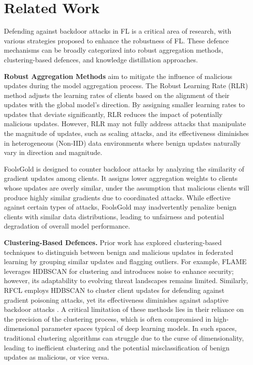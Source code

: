 \section{Related Work}
Defending against backdoor attacks in FL is a critical area of research, with various strategies proposed to enhance the robustness of FL. These defence mechanisms can be broadly categorized into robust aggregation methods, clustering-based defences, and knowledge distillation approaches.

\textbf{Robust Aggregation Methods} aim to mitigate the influence of malicious updates during the model aggregation process. The Robust Learning Rate (RLR) method \cite{ref_article17} adjusts the learning rates of clients based on the alignment of their updates with the global model's direction. By assigning smaller learning rates to updates that deviate significantly, RLR reduces the impact of potentially malicious updates. However, RLR may not fully address attacks that manipulate the magnitude of updates, such as scaling attacks, and its effectiveness diminishes in heterogeneous (Non-IID) data environments where benign updates naturally vary in direction and magnitude. 

FoolsGold \cite{ref_article8} is designed to counter backdoor attacks by analyzing the similarity of gradient updates among clients. It assigns lower aggregation weights to clients whose updates are overly similar, under the assumption that malicious clients will produce highly similar gradients due to coordinated attacks. While effective against certain types of attacks, FoolsGold may inadvertently penalize benign clients with similar data distributions, leading to unfairness and potential degradation of overall model performance.

\textbf{Clustering-Based Defences.} Prior work has explored clustering-based techniques to distinguish between benign and malicious updates in federated learning by grouping similar updates and flagging outliers. For example, FLAME \cite{ref_article16} leverages HDBSCAN for clustering and introduces noise to enhance security; however, its adaptability to evolving threat landscapes remains limited. Similarly, RFCL \cite{ref_article1} employs HDBSCAN to cluster client updates for defending against gradient poisoning attacks, yet its effectiveness diminishes against adaptive backdoor attacks \cite{ref_article22}. A critical limitation of these methods lies in their reliance on the precision of the clustering process, which is often compromised in high-dimensional parameter spaces typical of deep learning models. In such spaces, traditional clustering algorithms can struggle due to the curse of dimensionality, leading to inefficient clustering and the potential misclassification of benign updates as malicious, or vice versa.

